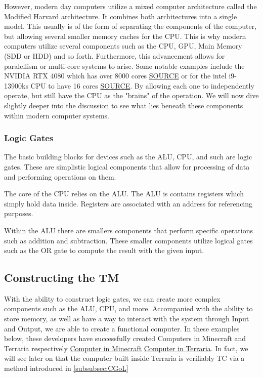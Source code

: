 However, modern day computers utilize a mixed computer architecture called the Modified Harvard architecture.
It combines both architectures into a single model.
This usually is of the form of separating the components of the computer, but allowing several smaller memory caches for the CPU.
This is why modern computers utilize several components such as the CPU, GPU, Main Memory (SDD or HDD) and so forth.
Furthermore, this advancement allows for paralellism or multi-core systems to arise.
Some notable examples include the NVIDIA RTX 4080 which has over 8000 cores \href{https://www.techpowerup.com/gpu-specs/geforce-rtx-4080.c3888}{SOURCE} or for the intel i9-13900ks CPU to have 16 cores \href{https://www.intel.com/content/www/us/en/products/sku/232167/intel-core-i913900ks-processor-36m-cache-up-to-6-00-ghz/specifications.html}{SOURCE}.
By allowing each one to independently operate, but still have the CPU as the "brains" of the operation.
We will now dive slightly deeper into the discussion to see what lies beneath these components within modern computer systems.

\subsubsection{Logic Gates}

The basic building blocks for devices such as the ALU, CPU, and such are logic gates.
These are simplistic logical components that allow for processing of data and performing operations on them.

The core of the CPU relies on the ALU.
The ALU is contains registers which simply hold data inside.
Registers are associated with an address for referencing purposes.

Within the ALU there are smallers components that perform specific operations such as addition and subtraction.
These smaller components utilize logical gates such as the OR gate to compute the result with the given input.

\subsection{Constructing the TM}

With the ability to construct logic gates, we can create more complex components such as the ALU, CPU, and more.
Accompanied with the ability to store memory, as well as have a way to interact with the system through Input and Output, we are able to create a functional computer.
In these examples below, these developers have successfully created Computers in Minecraft and Terraria respectively
\href{https://www.youtube.com/watch?v=CW9N6kGbu2I}{Computer in Minecraft}
\href{https://www.youtube.com/watch?v=zXPiqk0-zDY}{Computer in Terraria}.
In fact, we will see later on that the computer built inside Terraria is verifiably TC via a method introduced in \ref{subsubsec:CGoL}

